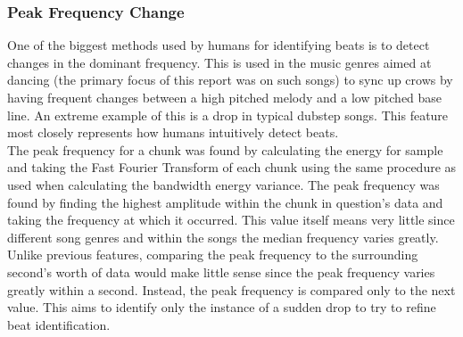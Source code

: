 \subsubsection{Peak Frequency Change}
One of the biggest methods used by humans for identifying beats is to detect changes in the dominant frequency. This is used in the music genres aimed at dancing (the primary focus of this report was on such songs) to sync up crows by having frequent changes between a high pitched melody and a low pitched base line. An extreme example of this is a drop in typical dubstep songs. This feature most closely represents how humans intuitively detect beats.\\

The peak frequency for a chunk was found by calculating the energy for sample and taking the Fast Fourier Transform of each chunk using the same procedure as used when calculating the bandwidth energy variance. The peak frequency was found by finding the highest amplitude within the chunk in question's data and taking the frequency at which it occurred. This value itself means very little since different song genres and within the songs the median frequency varies greatly. Unlike previous features, comparing the peak frequency to the surrounding second's worth of data would make little sense since the peak frequency varies greatly within a second. Instead, the peak frequency is compared only to the next value. This aims to identify only the instance of a sudden drop to try to refine beat identification.
